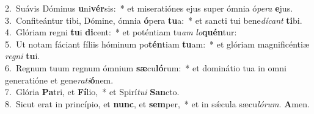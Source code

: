 {2.~}Suávis Dóminus \textbf{u}ni\textbf{vér}sis:~* et miseratiónes ejus super ómnia ó\textit{pe}\textit{ra} \textbf{e}jus.\\
{3.~}Confiteántur tibi, Dómine, ómnia \textbf{ó}pera \textbf{tu}a:~* et sancti tui bene\textit{dí}\textit{cant} \textbf{ti}bi.\\
{4.~}Glóriam regni \textbf{tu}i \textbf{di}cent:~* et poténtiam tu\textit{am} \textit{lo}\textbf{quén}tur:\\
{5.~}Ut notam fáciant fíliis hóminum po\textbf{tén}tiam \textbf{tu}am:~* et glóriam magnificéntiæ \textit{re}\textit{gni} \textbf{tu}i.\\
{6.~}Regnum tuum regnum ómnium \textbf{sæ}cu\textbf{ló}rum:~* et dominátio tua in omni generatióne et gene\textit{ra}\textit{ti}\textbf{ó}nem.\\
{7.~}Glória \textbf{Pa}tri, et \textbf{Fí}lio,~* et Spirí\textit{tu}\textit{i} \textbf{San}cto.\\
{8.~}Sicut erat in princípio, et \textbf{nunc}, et \textbf{sem}per,~* et in sǽcula sæcu\textit{ló}\textit{rum}. \textbf{A}men.\\
